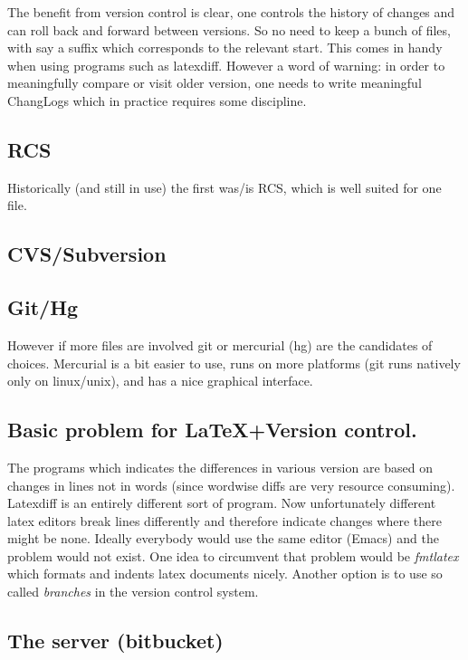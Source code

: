 \documentclass[11pt]{article}
\begin{document}
The benefit from version control is clear, one controls the history of
changes and can roll back and forward between versions. So no need to
keep a bunch of files, with say a suffix which corresponds to the
relevant start. This comes in handy when using programs such as
latexdiff. However a word of warning: in order to meaningfully compare
or visit older version, one needs to write meaningful ChangLogs which
in practice requires some discipline.
\subsection{RCS}
\label{sec:orgheadline5}
Historically (and still in use) the first was/is RCS, which is well
suited for one file. 
\subsection{CVS/Subversion}
\label{sec:orgheadline6}

\subsection{Git/Hg}
\label{sec:orgheadline7}

However if more files are involved git or
mercurial (hg) are the candidates of choices. Mercurial is a bit
easier to use, runs on more platforms (git runs natively only on
linux/unix), and has a nice graphical interface.

\subsection{Basic problem for \LaTeX{}+Version control.}
\label{sec:orgheadline8}

The programs which indicates the differences in various version are
based on changes in lines not in words (since wordwise diffs are very
resource consuming). Latexdiff is an entirely different sort of
program. Now unfortunately different latex editors break lines
differently and therefore indicate changes where there might be none.
Ideally everybody would use the same editor (Emacs) and the problem
would not exist. One idea to circumvent that problem would be
\emph{fmtlatex} which formats and indents latex documents nicely. Another
option is to use so called \emph{branches} in the version control system.

\subsection{The server (bitbucket)}
\label{sec:orgheadline9}
\end{document}
